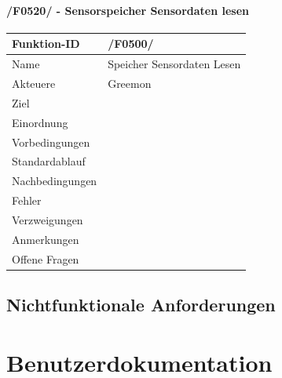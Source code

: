 \documentclass[pointlessnumbers]{scrartcl}
\begin{document}
 \subsubsection{/F0520/ - Sensorspeicher Sensordaten lesen }
 \begin{tabular}{|p{\BreiteErsterTab}|p{\BreiteZweiterTab}|}\hline
    Funktion-ID &       /F0500/  
                        \\ \hline
    Name &              Speicher Sensordaten Lesen
                        \\ \hline
    Akteuere &          Greemon
                        \\ \hline
    Ziel &             
                        \\ \hline
    Einordnung &        
                        \\ \hline
    Vorbedingungen &    
                        \\ \hline
    Standardablauf &    
                        \\ \hline
    Nachbedingungen &   
                        \\ \hline
    Fehler &       
                        \\ \hline
    Verzweigungen &     
                        \\ \hline
    Anmerkungen &       
                        \\ \hline
    Offene Fragen &     
                        \\ \hline
 \end{tabular} 



\section{Nichtfunktionale Anforderungen}




\chapter{Benutzerdokumentation}


\end{document}
